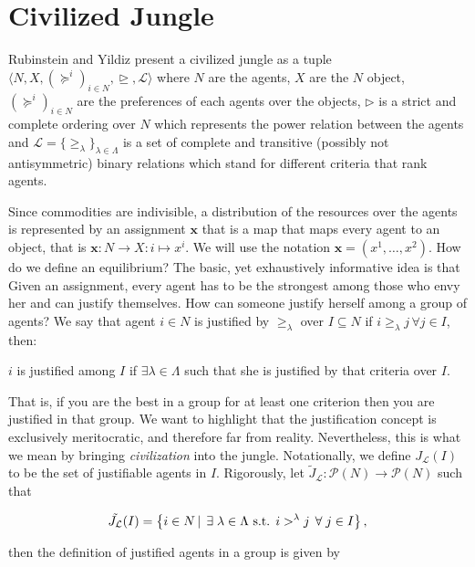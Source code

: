 \section{Civilized Jungle}

Rubinstein and Yildiz \cite{RY} present a civilized jungle as a tuple $\langle N,X,(\succeq^i)_{i\in N}, \trianglerighteq, \mathcal{L}\rangle$ where $N$ are the agents, $X$ are the $N$ object, $(\succeq^i)_{i\in N}$ are the preferences of each agents over the objects, $\triangleright$ is a strict and complete ordering over $N$ which represents the power relation between the agents and $\mathcal{L}=\{\geq_{\lambda}\}_{\lambda\in\Lambda}$ is a set of complete and transitive (possibly not antisymmetric) binary relations which stand for different criteria that rank agents. 

Since commodities are indivisible, a distribution of the resources over the agents is represented by an assignment $\textbf{x}$ that is a map that maps every agent to an object, that is $\textbf{x}:N\rightarrow X:i\mapsto x^i$. We will use the notation $\textbf{x}=(x^1,\dots,x^2)$. How do we define an equilibrium? The basic, yet exhaustively informative idea is that Given an assignment, every agent has to be the strongest among those who envy her and can justify themselves. How can someone justify herself among a group of agents? We say that agent $i\in N$ is justified by $\geq_{\lambda}$ over $I\subseteq N$ if $i\geq_{\lambda} j\,\forall j\in I$, then:

\begin{center}
$i$ is justified among $I$ if $\exists\lambda\in\Lambda$ such that she is justified by that criteria over $I$.
\end{center}

That is, if you are the best in a group for at least one criterion then you are justified in that group. We want to highlight that the justification concept is exclusively meritocratic, and therefore far from reality. Nevertheless, this is what we mean by bringing \textit{civilization} into the jungle. 
Notationally, we define $J_{\mathcal{L}}(I)$ to be the set of justifiable agents in $I$. Rigorously, let $\tilde{J}_{\mathcal{L}}:\mathcal{P}(N)\rightarrow\mathcal{P}(N)$ such that

\[\Tilde{J_{\mathcal{L}}}(I)=\left\{i\in N\,|\, \exists\lambda\in\Lambda\text{ s.t. }i>^{\lambda}j\,\forall j\in I\right\},\]

then the definition of justified agents in a group is given by

